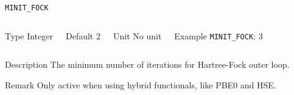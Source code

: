 \begin{frame}[allowframebreaks]{\texttt{MINIT\_FOCK}} \label{MINIT_FOCK}
\vspace*{-12pt}
\begin{columns}
\begin{block}{Type}
Integer
\end{block}

\begin{block}{Default}
2
\end{block}

\begin{block}{Unit}
No unit
\end{block}

\begin{block}{Example}
\texttt{MINIT\_FOCK}: 3
\end{block}
\end{columns}

\begin{block}{Description}
The minimum number of iterations for Hartree-Fock outer loop.
\end{block}

\begin{block}{Remark}
Only active when using hybrid functionals, like PBE0 and HSE. 
\end{block}

\end{frame}


